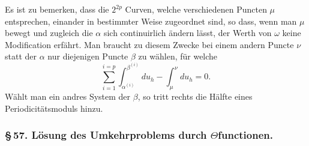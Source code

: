 \documentclass[10pt]{article}
\begin{document}
Es ist zu bemerken, dass die \(2^{2p}\) Curven, welche verschiedenen Puncten \(\mu\) entsprechen, einander in bestimmter Weise zugeordnet sind, so dass, wenn man \(\mu\) bewegt und zugleich die \(\alpha\) sich continuirlich ändern lässt, der Werth von \(\omega\) keine Modification erfährt. Man braucht zu diesem Zwecke bei einem andern Puncte \(\nu\) statt der \(\alpha\) nur diejenigen Puncte \(\beta\) zu wählen, für welche
\[
\sum_{i=1}^{i=p}\int_{\alpha^{(i)}}^{\beta^{(i)}}du_h-\int_{\mu}^{\nu}du_h=0.
\]
Wählt man ein andres System der \(\beta\), so tritt rechts die Hälfte eines Periodicitätsmoduls hinzu.

\subsubsection*{\S\,57. Lösung des Umkehrproblems durch \(\Theta\)functionen.}
\end{document}
